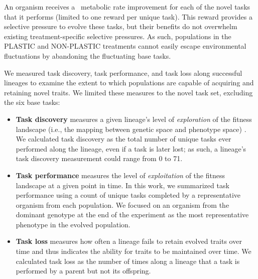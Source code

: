 An organism receives a \novelTraitsReward\ metabolic rate improvement for each of the novel tasks that it performs (limited to one reward per unique task).
This reward provides a selective pressure to evolve these tasks, but their benefits do not overwhelm existing treatment-specific selective pressures.
As such, populations in the PLASTIC and NON-PLASTIC treatments cannot easily escape environmental fluctuations by abandoning the fluctuating base tasks.

We measured task discovery, task performance, and task loss along successful lineages to examine the extent to which populations are capable of acquiring and retaining novel traits. %
We limited these measures to the novel task set, excluding the six base tasks:

\begin{itemize}

\item \textbf{Task discovery} measures a given lineage's level of \textit{exploration} of the fitness landscape (i.e., the mapping between genetic space and phenotype space) \citep{canino-koning_fluctuating_2019}. 
We calculated task discovery as the total number of unique tasks ever performed along the lineage, even if a task is later lost; as such, a lineage's task discovery measurement could range from 0 to 71.

\item \textbf{Task performance} measures the level of \textit{exploitation} of the fitness landscape at a given point in time.
In this work, we summarized task performance using a count of unique tasks completed by a representative organism from each population.
We focused on an organism from the dominant genotype at the end of the experiment as the most representative phenotype in the evolved population.

\item \textbf{Task loss} measures how often a lineage fails to retain evolved traits over time and thus indicates the ability for traits to be maintained over time.
We calculated task loss as the number of times along a lineage that a task is performed by a parent but not its offspring. 

\end{itemize}

